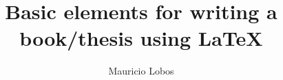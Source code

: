 \documentclass[a4paper]{book}
\begin{document}

\pagestyle{empty}
\title{Basic elements for writing a book/thesis using \LaTeX}
\author{Mauricio Lobos}
\date{}
\maketitle

\pagestyle{plain}
\listoftodos
\tableofcontents








\begin{appendix}


\end{appendix}


%



\listoffigures
\listoftables

\printindex

\end{document}
